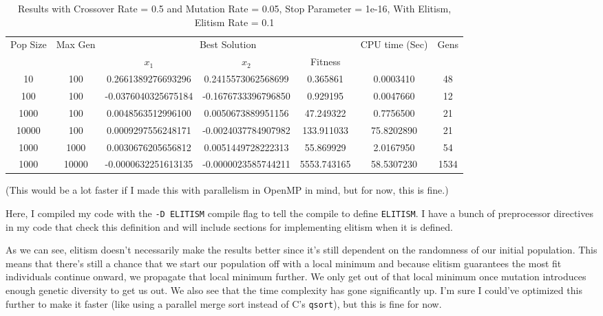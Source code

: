 \documentclass[12pt]{article}
\begin{document}
    \begin{table}[h!]
        \small
		\caption{
    Results with Crossover Rate = 0.5 and Mutation Rate = 0.05, Stop Parameter = 1e-16, With Elitism, Elitism Rate = 0.1}
		\label{table:1}
		\centering
		\begin{tabular}{c c c c c c c}
			\hline
			Pop Size & Max Gen & \multicolumn{3}{c}{Best Solution} & CPU time (Sec) & Gens \\
			& & $x_1$ & $x_2$ & Fitness & \\
			\hline
			10    & 100 & 0.2661389276693296  & 0.2415573062568699  & 0.365861    & 0.0003410 & 48 \\
			100   & 100 & -0.0376040325675184 & -0.1676733396796850 & 0.929195    & 0.0047660 & 12  \\
			1000  & 100 & 0.0048563512996100  & 0.0050673889951156  & 47.249322   & 0.7756500 & 21 \\
			10000 & 100 & 0.0009297556248171  & -0.0024037784907982 & 133.911033  & 75.8202890 & 21 \\
			\hline
			1000 & 1000    & 0.0030676205656812  & 0.0051449728222313  & 55.869929    & 2.0167950 & 54 \\
			1000 & 10000   & -0.0000632251613135 & -0.0000023585744211 & 5553.743165  & 58.5307230 & 1534 \\
			\hline
		\end{tabular}
	\end{table}

    \newpage

    (This would be a lot faster if I made this with parallelism in OpenMP in mind, but for now, this is fine.)

    Here, I compiled my code with the \verb|-D ELITISM| compile flag to tell the compile to define \verb|ELITISM|. I have a bunch of preprocessor directives in my code that check this definition and will include sections for implementing elitism when it is defined.

    As we can see, elitism doesn't necessarily make the results better since it's still dependent on the randomness of our initial population. This means that there's still a chance that we start our population off with a local minimum and because elitism guarantees the most fit individuals continue onward, we propagate that local minimum further. We only get out of that local minimum once mutation introduces enough genetic diversity to get us out. We also see that the time complexity has gone significantly up. I'm sure I could've optimized this further to make it faster (like using a parallel merge sort instead of C's \verb|qsort|), but this is fine for now.
\end{document}
